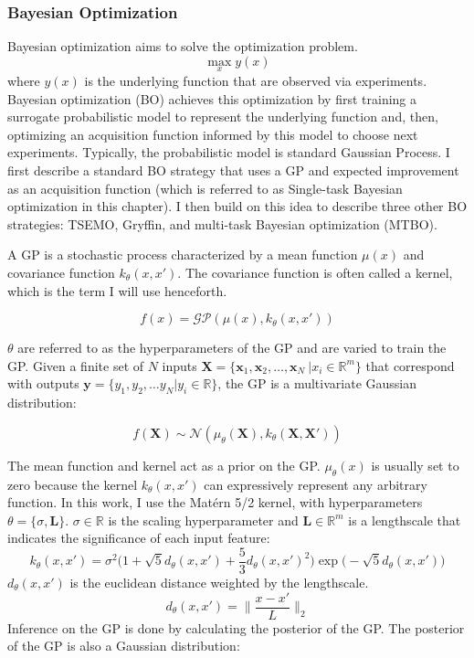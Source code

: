 \subsubsection{Bayesian Optimization}

Bayesian optimization aims to solve the optimization problem.
\begin{equation}
    \max_x y(x)
\end{equation}
where $y(x)$ is the underlying function that are observed via experiments. Bayesian optimization (BO) achieves this optimization by first training a surrogate probabilistic model to represent the underlying function and, then, optimizing an acquisition function informed by this model to choose next experiments. Typically,  the probabilistic model is standard Gaussian Process. I first describe a standard BO strategy that uses a GP and expected improvement as an acquisition function (which is referred to as Single-task Bayesian optimization in this chapter). I then build on this idea to describe three other BO strategies: TSEMO, Gryffin, and multi-task Bayesian optimization (MTBO).

A GP is a stochastic process characterized by a mean function $\mu(x)$ and covariance function $k_{\theta}(x,x')$. The covariance function is often called a kernel, which is the term I will use henceforth.

\begin{equation}
    f(x)= \mathcal{GP}(\mu(x), k_{\theta}(x, x'))
\end{equation}

$\theta$ are referred to as the hyperparameters of the GP and are varied to train the GP. Given a finite set of $N$ inputs $\mathbf X = \{\mathbf x_1, \mathbf x_2, \dots, \mathbf x_N \ \vert x_i \in \mathbb R^m \}$ that correspond with outputs $\mathbf y = \{y_1, y_2, \dots y_N \vert  y_i \in \mathbb R \}$, the GP is a multivariate Gaussian distribution:

\begin{equation}
    f(\mathbf X) \sim \mathcal N(\mu_{\theta}(\mathbf X), k_{\theta}(\mathbf X, \mathbf X'))
\end{equation}

The mean function and kernel act as a prior on the GP.  $\mu_{\theta}(x)$ is usually set to zero because the kernel  $k_{\theta}(x, x')$ can expressively represent any arbitrary function. In this work, I use the Matérn 5/2 kernel, with hyperparameters $\theta=\{\sigma,\mathbf L \}$. $\sigma \in \mathbb R$ is the scaling hyperparameter and $\mathbf L \in \mathbb R^m$ is a lengthscale that indicates the significance of each input feature:
\begin{equation}
    k_{\theta}(x, x') = \sigma^2 \biggl(1 + \sqrt{5}d_{\theta}(x,x')+\frac{5}{3}d_{\theta}(x,x')^2\biggr)\exp\biggl(-\sqrt{5}d_{\theta}(x,x') \biggr)
\end{equation}
$d_{\theta}(x,x')$ is the euclidean distance weighted by the lengthscale.
\begin{equation}
    d_{\theta}(x,x')=\biggl\lVert \frac{x-x'}{L} \biggr\rVert_2
\end{equation}
Inference on the GP is done by calculating the posterior of the GP. The posterior of the GP is also a Gaussian distribution:

